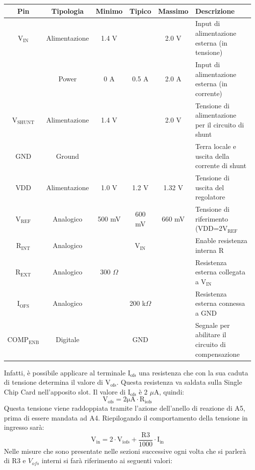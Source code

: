 \begin{center}
\begin{tiny}
\begin{tabular}{|c|c|c|c|c|l|}
\hline
\textbf{Pin} & \textbf{Tipologia} & \textbf{Minimo} & \textbf{Tipico} & \textbf{Massimo} & \textbf{Descrizione} \\ \hline

$\mathrm{V_{IN}}$ & Alimentazione & 1.4 V & & 2.0 V & Input di alimentazione esterna (in tensione)\\ \hline
 & Power & 0 A & 0.5 A & 2.0 A & Input di alimentazione esterna (in corrente)\\ \hline     
$\mathrm{V_{SHUNT}}$ & Alimentazione & 1.4 V & & 2.0 V & Tensione di alimentazione per il circuito di shunt\\ \hline
GND & Ground &  & &  & Terra locale e uscita della corrente di shunt\\ \hline
VDD & Alimentazione & 1.0 V & 1.2 V & 1.32 V & Tensione di uscita del regolatore\\ \hline
$\mathrm{V_{REF}}$ & Analogico & 500 mV & 600 mV & 660 mV & Tensione di riferimento (VDD=2$\mathrm{V_{REF}}$\\ \hline
$\mathrm{R_{INT}}$ & Analogico &  & $\mathrm{V_{IN}}$ &  & Enable resistenza interna R\\ \hline
$\mathrm{R_{EXT}}$ & Analogico & 300 $\Omega$ &  &  & Resistenza esterna collegata a $\mathrm{V_{IN}}$\\ \hline
$\mathrm{I_{OFS}}$ & Analogico &  & 200 k$\Omega$ &  & Resistenza esterna connessa a GND\\ \hline
$\mathrm{COMP_{ENB}}$ & Digitale &  & GND &  & Segnale per abilitare il circuito di compensazione\\ \hline
\end{tabular}
\end{tiny}
\end{center}

Infatti, è possibile applicare al terminale $\mathrm{I_{ofs}}$ una resistenza che con la sua caduta di tensione determina il valore di $\mathrm{V_{ofs}}$. 
Questa resistenza va saldata sulla Single Chip Card nell'apposito slot. Il valore di $\mathrm{I_{ofs}}$ è 2 $\mu$A, quindi:
\begin{equation}
\label{eq:Vofs}
\mathrm{V_{ofs} = 2 \mu A \cdot R_{iofs}}
\end{equation}
Questa tensione viene raddoppiata tramite l'azione dell'anello di reazione di A5, prima di essere mandata ad A4.
Riepilogando il comportamento della tensione in ingresso sarà:
\begin{equation}
\mathrm{V_{in}= 2 \cdot V_{iofs} + \dfrac{R3}{1000} \cdot I_{in}}
\end{equation}
Nelle misure che sono presentate nelle sezioni successive ogni volta che si parlerà di R3 e $V_{ofs}$ interni si farà riferimento ai seguenti valori:

